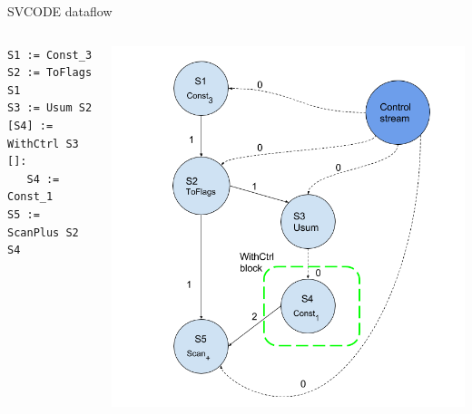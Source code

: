 \documentclass{beamer}
\begin{document}
\begin{frame}[fragile]{SVCODE dataflow}
\begin{columns}
\begin{column}{0.36\textwidth}

\begin{lstlisting}[style=svcode-style]
S1 := Const_3
S2 := ToFlags S1
S3 := Usum S2
[S4] := WithCtrl S3 []:
   S4 := Const_1
S5 := ScanPlus S2 S4
\end{lstlisting}	
	\end{column}	
	\begin{column}{0.64\textwidth}
	\includegraphics[width=1.1\textwidth]{../fig/dataflow.png}
	\end{column}
\end{columns}
\end{frame}
\end{document}
